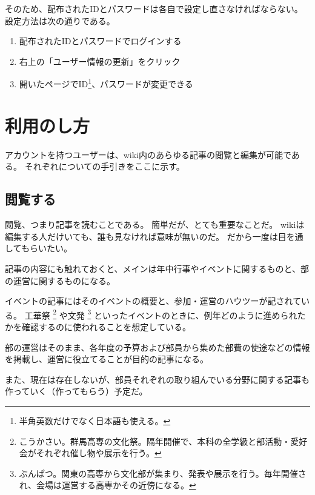 \documentclass[lualatex,ja=standard,12pt,a4j]{bxjsbook}
\begin{document}
                そのため、配布されたIDとパスワードは各自で設定し直さなければならない。
                設定方法は次の通りである。
                
                \begin{enumerate}
                	\item 配布されたIDとパスワードでログインする
                    \item 右上の「ユーザー情報の更新」をクリック
                    \item 開いたページでID\footnote{半角英数だけでなく日本語も使える。}、パスワードが変更できる
                \end{enumerate}
                
		\section{利用のし方}
        	アカウントを持つユーザーは、wiki内のあらゆる記事の閲覧と編集が可能である。
            それぞれについての手引きをここに示す。
            
            \subsection{閲覧する}
            	閲覧、つまり記事を読むことである。
                簡単だが、とても重要なことだ。
                wikiは編集する人だけいても、誰も見なければ意味が無いのだ。
                だから一度は目を通してもらいたい。
                
                記事の内容にも触れておくと、メインは年中行事やイベントに関するものと、部の運営に関するものになる。
                
                イベントの記事にはそのイベントの概要と、参加・運営のハウツーが記されている。
                工華祭
                \footnote{こうかさい。群馬高専の文化祭。隔年開催で、本科の全学級と部活動・愛好会がそれぞれ催し物や展示を行う。}
                や文発
                \footnote{ぶんぱつ。関東の高専から文化部が集まり、発表や展示を行う。毎年開催され、会場は運営する高専かその近傍になる。}
                といったイベントのときに、例年どのように進められたかを確認するのに使われることを想定している。
                
                部の運営はそのまま、各年度の予算および部員から集めた部費の使途などの情報を掲載し、運営に役立てることが目的の記事になる。
                
                また、現在は存在しないが、部員それぞれの取り組んでいる分野に関する記事も作っていく（作ってもらう）予定だ。
                
\end{document}
